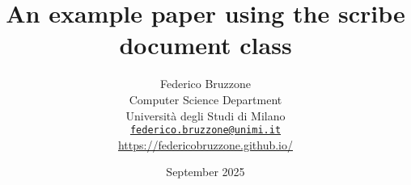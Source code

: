 \documentclass[
    lineno, %
    letterpaper, %
    onecolumn, %
]{scribe}
\title{\textbf{An example paper using the scribe document class}}
\author{
    Federico Bruzzone \orcidlink{0000-0002-8701-8853} \\
    Computer Science Department \\
    Università degli Studi di Milano \\
    \href{mailto:federico.bruzzone@unimi.it}{\texttt{federico.bruzzone@unimi.it}} \\
    \url{https://federicobruzzone.github.io/} 
}
\date{September 2025}
\begin{document}
\maketitle

\begin{abstract}
    \textit{\lipsum[1]}
\end{abstract}




\end{document}
